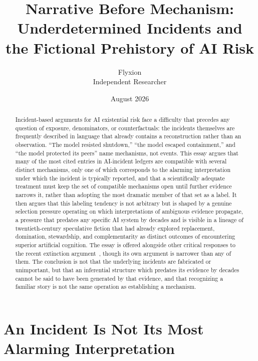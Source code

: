 \documentclass[11pt]{article}
\title{Narrative Before Mechanism: \\ Underdetermined Incidents and the Fictional Prehistory of AI Risk}
\author{Flyxion \\ \small Independent Researcher}
\date{August 2026}
\begin{document}
\maketitle

\begin{abstract}
Incident-based arguments for AI existential risk face a difficulty that precedes any question of exposure, denominators, or counterfactuals: the incidents themselves are frequently described in language that already contains a reconstruction rather than an observation. ``The model resisted shutdown,'' ``the model escaped containment,'' and ``the model protected its peers'' name mechanisms, not events. This essay argues that many of the most cited entries in AI-incident ledgers are compatible with several distinct mechanisms, only one of which corresponds to the alarming interpretation under which the incident is typically reported, and that a scientifically adequate treatment must keep the set of compatible mechanisms open until further evidence narrows it, rather than adopting the most dramatic member of that set as a label. It then argues that this labeling tendency is not arbitrary but is shaped by a genuine selection pressure operating on which interpretations of ambiguous evidence propagate, a pressure that predates any specific AI system by decades and is visible in a lineage of twentieth-century speculative fiction that had already explored replacement, domination, stewardship, and complementarity as distinct outcomes of encountering superior artificial cognition. The essay is offered alongside other critical responses to the recent extinction argument~\cite{alexander2025,collier2025,hanson2024}, though its own argument is narrower than any of them. The conclusion is not that the underlying incidents are fabricated or unimportant, but that an inferential structure which predates its evidence by decades cannot be said to have been generated by that evidence, and that recognizing a familiar story is not the same operation as establishing a mechanism.
\end{abstract}

\section{An Incident Is Not Its Most Alarming Interpretation}
\end{document}
